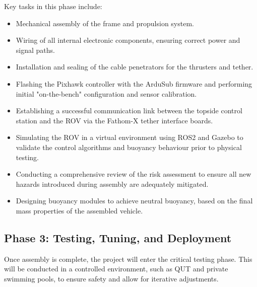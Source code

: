 \documentclass[11pt, a4paper]{article}
\begin{document}
Key tasks in this phase include:
\begin{itemize}
    \item Mechanical assembly of the frame and propulsion system.
    \item Wiring of all internal electronic components, ensuring correct power and signal paths.
    \item Installation and sealing of the cable penetrators for the thrusters and tether.
    \item Flashing the Pixhawk controller with the ArduSub firmware and performing initial "on-the-bench" configuration and sensor calibration.
    \item Establishing a successful communication link between the topside control station and the ROV via the Fathom-X tether interface boards.
    \item Simulating the ROV in a virtual environment using ROS2 and Gazebo to validate the control algorithms and buoyancy behaviour prior to physical testing.
    \item Conducting a comprehensive review of the risk assessment to ensure all new hazards introduced during assembly are adequately mitigated.
    \item Designing buoyancy modules to achieve neutral buoyancy, based on the final mass properties of the assembled vehicle.
\end{itemize}

\subsection{Phase 3: Testing, Tuning, and Deployment}
Once assembly is complete, the project will enter the critical testing phase. This will be conducted in a controlled environment, such as QUT and private swimming pools, to ensure safety and allow for iterative adjustments.
\end{document}
